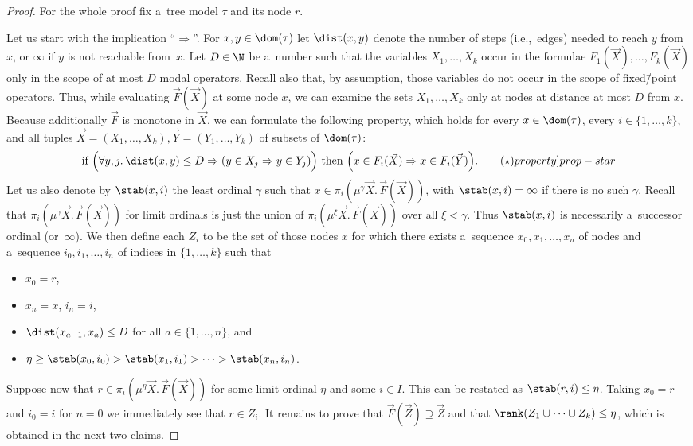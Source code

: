 \documentclass{lmcs}
\numberwithin{equation}{section}
\numberwithin{figure}{section}
\begin{document}
\begin{proof}
	For the whole proof fix a~tree model $\tau$ and its node $r$.

	Let us start with the implication ``$\Rightarrow$''.
	For $x,y\in\dom(\tau)$ let $\dist(x,y)$ denote the number of steps (i.e.,~edges) needed to reach $y$ from $x$, or $\infty$ if $y$ is not reachable from~$x$.
	Let $D\in\N$ be a~number such that the variables $X_1,\dots,X_k$ occur in the formulae $F_1(\vec{X}),\dots,F_k(\vec{X})$ only in the scope of at most $D$ modal operators.
	Recall also that, by assumption, those variables do not occur in the scope of fixed\=/point operators.
	Thus, while evaluating $\vec{F}(\vec{X})$ at some node $x$, we can examine the sets $X_1,\dots,X_k$ only at nodes at distance at most $D$ from $x$.
	Because additionally $\vec{F}$ is monotone in $\vec{X}$, we can formulate the following property,
	which holds for every $x\in\dom(\tau)$, every $i\in\{1,\dots,k\}$, and all tuples $\vec{X}=(X_1,\dots,X_k),\vec{Y}=(Y_1,\dots,Y_k)$ of subsets of $\dom(\tau)$:
	\begin{align}
		\mbox{if }\Big(\forall y,j.\,\dist(x,y)\leq D\Rightarrow(y\in X_j\Rightarrow y\in Y_j)\Big)
		\mbox{ then }\Big(x\in F_i(\vec{X})\Rightarrow x\in F_i(\vec{Y})\Big).\tag{$\star$}\label[property]{prop-star}
	\end{align}
	Let us also denote by $\stab(x,i)$ the least ordinal $\gamma$ such that $x\in\pi_i(\mu^\gamma\vec{X}.\,\vec{F}(\vec{X}))$, with $\stab(x,i)=\infty$ if there is no such $\gamma$.
	Recall that $\pi_i(\mu^\gamma\vec{X}.\,\vec{F}(\vec{X}))$ for limit ordinals is just the union of $\pi_i(\mu^{\xi}\vec{X}.\,\vec{F}(\vec{X}))$ over all $\xi<\gamma$.
	Thus $\stab(x,i)$ is necessarily a~successor ordinal (or~$\infty$).
	We then define each $Z_i$ to be the set of those nodes $x$ for which there exists a~sequence $x_0,x_1,\dots,x_n$ of nodes and a~sequence $i_0,i_1,\dots,i_n$ of indices in $\{1,\dots,k\}$ such that
	\begin{itemize}
	\item	$x_0=r$,
	\item	$x_n=x$, $i_n=i$,
	\item	$\dist(x_{a-1},x_a)\leq D$ for all $a\in\{1,\dots,n\}$, and
	\item	$\eta\geq\stab(x_0,i_0)>\stab(x_1,i_1)>\dots>\stab(x_n,i_n)$.
	\end{itemize}
	Suppose now that $r\in\pi_i(\mu^\eta\vec{X}.\,\vec{F}(\vec{X}))$ for some limit ordinal $\eta$ and some $i\in I$.
	This can be restated as $\stab(r,i)\leq\eta$.
	Taking $x_0=r$ and $i_0=i$ for $n=0$ we immediately see that $r\in Z_i$.
	It remains to prove that $\vec{F}(\vec{Z})\supseteq\vec{Z}$ and that $\rank(Z_1\cup\dots\cup Z_k)\leq\eta$, which is obtained in the next two claims.


\end{proof}
\end{document}
